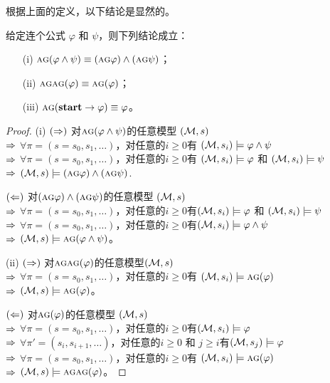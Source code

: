 根据上面的定义，以下结论是显然的。
\begin{lemma} \label{lem:equivAG}
	给定连个公式 $\varphi$ 和 $\psi$，则下列结论成立：
	\begin{itemize}
		\item[(i)] $\textsc{a}\textsc{g} (\varphi\land\psi)\equiv (\textsc{a}\textsc{g} \varphi) \land (\textsc{a}\textsc{g}\psi)$；
		\item[(ii)] $\textsc{a}\textsc{g} \textsc{a}\textsc{g} (\varphi)\equiv \textsc{a}\textsc{g} (\varphi)$；
		\item[(iii)] $\textsc{a}\textsc{g} (\textbf{start} \rightarrow\varphi)\equiv \varphi$。
	\end{itemize}
\end{lemma}
\begin{proof}
	(i) $(\Rightarrow)$ 对$\textsc{a}\textsc{g} (\varphi\land\psi)$的任意模型 $({\cal M}, s)$\\
	$\Rightarrow$ $\forall \pi=(s=s_0, s_1, \dots)$，对任意的$i\geq 0$有 $({\cal M},s_i) \models \varphi \wedge \psi$\\
	$\Rightarrow$ $\forall \pi=(s=s_0, s_1, \dots)$，对任意的$i\geq 0$有 $({\cal M},s_i) \models \varphi$ 和 $({\cal M},s_i) \models \psi$\\
	$\Rightarrow$ $({\cal M},s) \models (\textsc{a}\textsc{g} \varphi) \land (\textsc{a}\textsc{g}\psi)$.
	
	$(\Leftarrow)$ 对$(\textsc{a}\textsc{g} \varphi) \land (\textsc{a}\textsc{g}\psi)$的任意模型 $({\cal M},s)$\\
	$\Rightarrow$ $\forall \pi=(s=s_0, s_1, \dots)$，对任意的$i\geq 0$有$({\cal M},s_i) \models \varphi$ 和 $({\cal M},s_i) \models \psi$\\
	$\Rightarrow$ $\forall \pi=(s=s_0, s_1, \dots)$，对任意的$i\geq 0$有$({\cal M},s_i) \models \varphi \wedge \psi$ \\
	$\Rightarrow$ $({\cal M}, s) \models \textsc{a}\textsc{g} (\varphi\land\psi)$。
	
	(ii) $(\Rightarrow)$ 对$\textsc{a}\textsc{g} \textsc{a}\textsc{g} (\varphi)$的任意模型$({\cal M}, s)$ \\
	$\Rightarrow$ $\forall \pi=(s=s_0, s_1, \dots)$，对任意的$i\geq 0$有 $({\cal M},s_i) \models \textsc{a}\textsc{g} (\varphi)$\\
	$\Rightarrow$ $({\cal M},s) \models \textsc{a}\textsc{g} (\varphi)$。

	$(\Leftarrow)$ 对$\textsc{a}\textsc{g} (\varphi)$的任意模型 $({\cal M}, s)$\\
	$\Rightarrow$ $\forall \pi=(s=s_0, s_1, \dots)$，对任意的$i\geq 0$有$({\cal M},s_i) \models \varphi$ \\
	$\Rightarrow$ $\forall \pi'=(s_i, s_{i+1}, \dots)$，对任意的$i\geq 0$ 和 $j \geq i$有$({\cal M},s_j) \models \varphi$ \\
	$\Rightarrow$ $\forall \pi=(s=s_0, s_1, \dots)$，对任意的$i\geq 0$有 $({\cal M},s_i) \models \textsc{a}\textsc{g} (\varphi)$ \\ 
	$\Rightarrow$ $({\cal M},s) \models\textsc{a}\textsc{g} \textsc{a}\textsc{g} (\varphi)$。
	

\end{proof}
